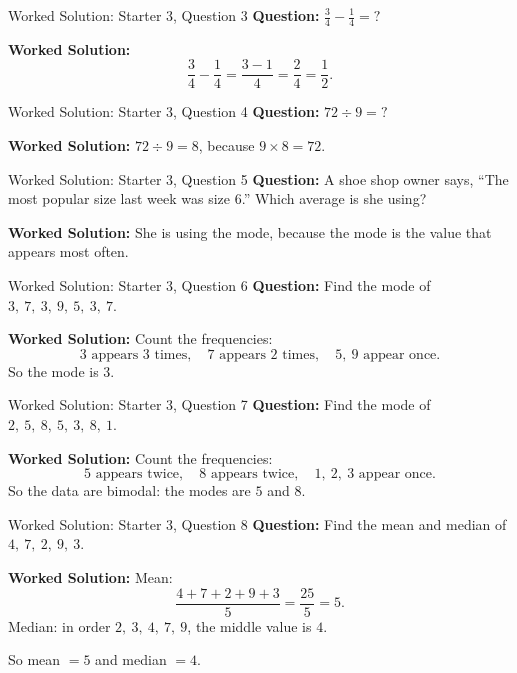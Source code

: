\documentclass{beamer}
\begin{document}
\begin{frame}{Worked Solution: Starter 3, Question 3}
\small
\textbf{Question:} \(\frac34-\frac14=\mathord{?}\)

\smallskip
\textbf{Worked Solution:}
\[
\frac34-\frac14=\frac{3-1}{4}=\frac24=\frac12.
\]
\end{frame}

\begin{frame}{Worked Solution: Starter 3, Question 4}
\small
\textbf{Question:} \(72 \div 9=\mathord{?}\)

\smallskip
\textbf{Worked Solution:} \(72 \div 9 = 8\), because \(9 \times 8 = 72\).
\end{frame}

\begin{frame}{Worked Solution: Starter 3, Question 5}
\small
\textbf{Question:} A shoe shop owner says, ``The most popular size last week was size 6.'' Which average is she using?

\smallskip
\textbf{Worked Solution:} She is using the mode, because the mode is the value that appears most often.
\end{frame}

\begin{frame}{Worked Solution: Starter 3, Question 6}
\small
\textbf{Question:} Find the mode of \(3,\ 7,\ 3,\ 9,\ 5,\ 3,\ 7\).

\smallskip
\textbf{Worked Solution:} Count the frequencies:
\[
3\text{ appears }3\text{ times},\quad 7\text{ appears }2\text{ times},\quad 5,\ 9\text{ appear once}.
\]
So the mode is \(3\).
\end{frame}

\begin{frame}{Worked Solution: Starter 3, Question 7}
\small
\textbf{Question:} Find the mode of \(2,\ 5,\ 8,\ 5,\ 3,\ 8,\ 1\).

\smallskip
\textbf{Worked Solution:} Count the frequencies:
\[
5\text{ appears twice},\quad 8\text{ appears twice},\quad 1,\ 2,\ 3\text{ appear once}.
\]
So the data are bimodal: the modes are \(5\) and \(8\).
\end{frame}

\begin{frame}{Worked Solution: Starter 3, Question 8}
\small
\textbf{Question:} Find the mean and median of \(4,\ 7,\ 2,\ 9,\ 3\).

\smallskip
\textbf{Worked Solution:} Mean:
\[
\frac{4+7+2+9+3}{5}=\frac{25}{5}=5.
\]
Median: in order \(2,\ 3,\ 4,\ 7,\ 9\), the middle value is \(4\).

So mean \(=5\) and median \(=4\).
\end{frame}
\end{document}
